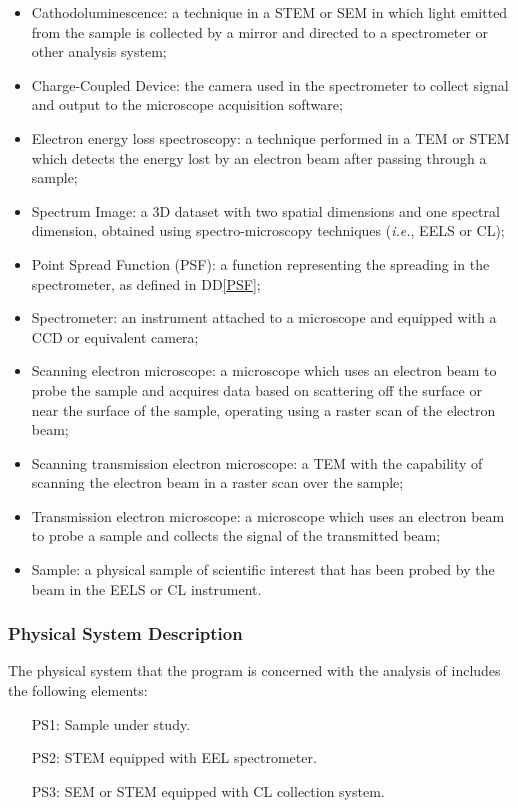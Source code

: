 \documentclass[12pt]{article}
\newcommand{\ddref}[1]{DD\ref{#1}}
\begin{document}
\begin{itemize}
	\item Cathodoluminescence: a technique in a STEM or SEM in which light emitted from the sample is collected by a mirror and directed to a spectrometer or other analysis system;
	\item Charge-Coupled Device: the camera used in the spectrometer to collect signal and output to the microscope acquisition software;
	\item Electron energy loss spectroscopy: a technique performed in a TEM or STEM which detects the energy lost by an electron beam after passing through a sample;
	\item Spectrum Image: a 3D dataset with two spatial dimensions and one spectral dimension, obtained using spectro-microscopy techniques (\textit{i.e.}, EELS or CL);
	\item Point Spread Function (PSF): a function representing the spreading in the spectrometer, as defined in \ddref{PSF};
	\item Spectrometer: an instrument attached to a microscope and equipped with a CCD or equivalent camera;
	\item Scanning electron microscope: a microscope which uses an electron beam to probe the sample and acquires data based on scattering off the surface or near the surface of the sample, operating using a raster scan of the electron beam;
	\item Scanning transmission electron microscope: a TEM with the capability of scanning the electron beam in a raster scan over the sample;
	\item Transmission electron microscope: a microscope which uses an electron beam to probe a sample and collects the signal of the transmitted beam;
	\item Sample: a physical sample of scientific interest that has been probed by the beam in the EELS or CL instrument. 
\end{itemize}

\subsubsection{Physical System Description}

The physical system that the program is concerned with the analysis of includes the following elements:

\begin{itemize}
	\item[PS1:] Sample under study.
	\item[PS2:] STEM equipped with EEL spectrometer.
	\item[PS3:] SEM or STEM equipped with CL collection system.
\end{itemize}
\end{document}

